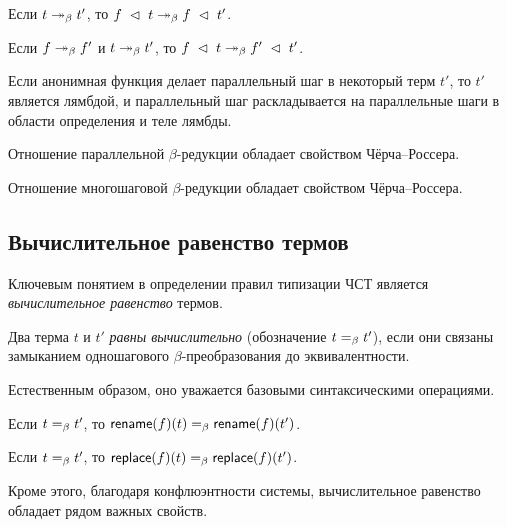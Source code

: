 \begin{lemma}
Если $t \twoheadrightarrow_{\beta} t'$, то $f\;\vartriangleleft\;t \twoheadrightarrow_{\beta} f\;\vartriangleleft\;t'$.
\end{lemma}

\begin{lemma}
Если $f \twoheadrightarrow_{\beta} f'$ и $t \twoheadrightarrow_{\beta} t'$, то
$f\;\vartriangleleft\;t \twoheadrightarrow_{\beta} f'\;\vartriangleleft\;t'$.
\end{lemma}

\begin{lemma}
Если анонимная функция делает параллельный шаг в
некоторый терм $t'$, то $t'$ является лямбдой, и
параллельный шаг раскладывается на параллельные шаги в
области определения и теле лямбды.
\end{lemma}

\begin{lemma}
Отношение параллельной $\beta$-редукции обладает
свойством Чёрча--Россера.
\end{lemma}

\begin{theorem}
Отношение многошаговой $\beta$-редукции обладает
свойством Чёрча--Россера.
\end{theorem}

\subsection{Вычислительное равенство термов}

Ключевым понятием в определении правил типизации ЧСТ
является \textit{вычислительное равенство} термов.

\begin{definition}
Два терма $t$ и $t'$ \emph{равны вычислительно}
(обозначение $t =_{\beta} t'$), если они связаны замыканием
одношагового $\beta$-преобразования до эквивалентности.
\end{definition}

Естественным образом, оно уважается базовыми
синтаксическими операциями.

\begin{lemma}
Если $t =_{\beta} t'$, то
$\mathsf{rename}(f)(t) =_{\beta} \mathsf{rename}(f)(t')$.
\end{lemma}

\begin{lemma}
Если $t =_{\beta} t'$, то
$\mathsf{replace}(f)(t) =_{\beta} \mathsf{replace}(f)(t')$.
\end{lemma}

Кроме этого, благодаря конфлюэнтности системы,
вычислительное равенство обладает рядом важных свойств.


